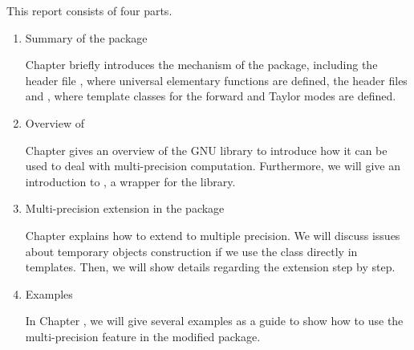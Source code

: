 
This report consists of four parts.
\begin{enumerate}
\item Summary of the \FADBADpp package
  
Chapter  briefly introduces the mechanism of the \FADBADpp package, including the header file \fadbad, where universal elementary functions are defined, the header files \fadiff and \tadiff, where template classes for the forward and Taylor modes are defined.

\item Overview of \MPFR

Chapter  gives an overview of the GNU \MPFR library to introduce how it can be used to deal with multi-precision computation. Furthermore, we will give an introduction to \MPFRCpp, a \Cpp wrapper for the \MPFR library.
 
\item Multi-precision extension in the \FADBADpp package
  
Chapter  explains how to extend \FADBADpp to multiple precision. We will discuss issues about temporary objects construction if we use the \mpreal class directly in \FADBADpp templates. Then, we will show details regarding the extension step by step.
\item Examples
  
In Chapter , we will give several examples as a guide to show how to use the multi-precision feature in the modified \FADBADpp package.
\end{enumerate} 






